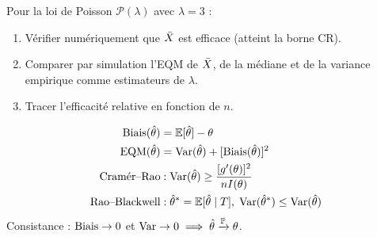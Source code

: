 \begin{exercice}
Pour la loi de Poisson $\mathcal{P}(\lambda)$ avec $\lambda=3$ :
\begin{enumerate}
\item V\'erifier num\'eriquement que $\bar{X}$ est efficace (atteint la borne CR).
\item Comparer par simulation l'EQM de $\bar{X}$, de la m\'ediane et de la variance empirique comme estimateurs de $\lambda$.
\item Tracer l'efficacit\'e relative en fonction de $n$.
\end{enumerate}
\end{exercice}

\begin{formules}
\begin{align*}
\operatorname{Biais}(\hat{\theta}) &= \mathbb{E}[\hat{\theta}]-\theta \\
\operatorname{EQM}(\hat{\theta}) &= \operatorname{Var}(\hat{\theta})+[\operatorname{Biais}(\hat{\theta})]^2 \\
\text{Cram\'er--Rao} &: \operatorname{Var}(\hat{\theta})\geq \frac{[g'(\theta)]^2}{nI(\theta)} \\
\text{Rao--Blackwell} &: \hat{\theta}^*=\mathbb{E}[\hat{\theta}\mid T],\;\operatorname{Var}(\hat{\theta}^*)\leq\operatorname{Var}(\hat{\theta})
\end{align*}
Consistance : $\operatorname{Biais}\to 0$ et $\operatorname{Var}\to 0 \implies \hat{\theta}\xrightarrow{\mathbb{P}}\theta$.
\end{formules}
